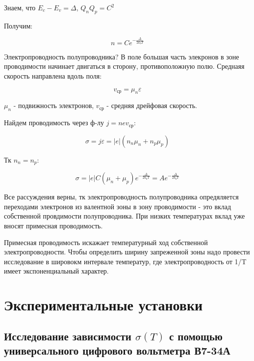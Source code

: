\documentclass[a4paper]{article}
\begin{document}
Знаем, что $E_c - E_v = \Delta$, $Q_n Q_p = C^2$

Получим:

\begin{equation}
    n = C e^{- \frac{\Delta}{2 k_b T}}
\end{equation}

Электропроводность полупроводника? В поле большая часть элекронов в зоне проводимости начинает двигаться в сторону, противоположную полю. 
Среднаяя скорость направлена вдоль поля:

\begin{equation}
    v_{ср} = \mu_n \varepsilon
\end{equation}

$\mu_n$ - подвижность электронов, $v_{ср}$ -  средняя дрейфовая скорость. \par 

Найдем проводимость через ф-лу $j = nev_{ср}$:

\begin{equation}
    \sigma = j \varepsilon  = |e| (n_n \mu_n + n_p \mu_p)
\end{equation}

Тк $n_n = n_p$:

\begin{equation}
    \sigma = |e|C(\mu_n + \mu_p) e^{- \frac{\Delta}{2k_b T}} = A e^{- \frac{\Delta}{2k_b T}}
\end{equation}

Все рассуждения верны, тк электропроводность полупроводника опредяляется переходами электронов из валентной зоны в зону проводимости - это вклад собственной провдимости полупроводника. 
При низких температурах вклад уже вносят примесная проводимость.  \par  

Примесная проводимость искажает температурный ход собственной электропроводности. Чтобы определить ширину запреженной зоны надо провести исследование в шировокм интервале температур, где электропроводность от 1/T
имеет экспоненциальный характер. 


\section{Экспериментальные установки}

\subsection{Исследование зависимости $\sigma(T)$ с помощью универсального цифрового вольтметра В7-34А}
\end{document}

